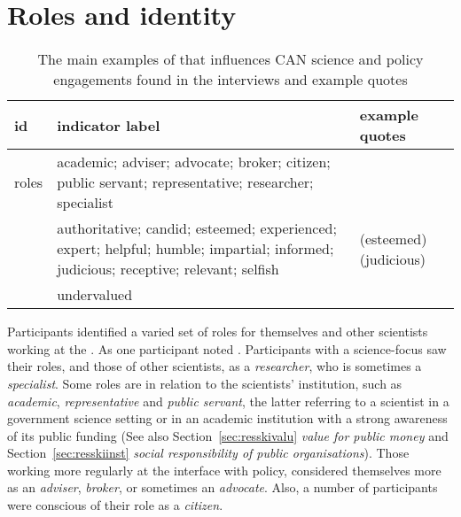 \section{Roles and identity}\label{sec:resroles}

\begin{table}[!ht]
\footnotesize
\caption{The main examples of \ismsr{} that influences CAN science and policy  engagements found in the interviews and example quotes}\label{tab:resrole}
\begin{tabular}{L{.15\linewidth}L{.35\linewidth}L{.5\linewidth}} \hline
\textbf{id} & \textbf{indicator label} & \textbf{example quotes} \\ \hline \hline
roles & academic; adviser; advocate; broker; citizen; public servant; representative; researcher; specialist &   \vfill {} \\[2mm]\rule{0pt}{4ex}
 & authoritative; candid; esteemed; experienced; expert; helpful; humble; impartial; informed; judicious; receptive; relevant; selfish &  (esteemed) \vfill {} (judicious) \\[2mm] \rule{0pt}{4ex}
& undervalued &  \\[5mm] \hline
\end{tabular}
\end{table}


Participants identified a varied set of roles for themselves and other scientists working at the \SPI. As one participant noted . Participants with a science-focus saw their roles, and those of other scientists, as a \emph{researcher}, who is sometimes a \emph{specialist}. Some roles are in relation to the scientists' institution, such as \emph{academic}, \emph{representative} and \emph{public servant}, the latter referring to a scientist in a government science setting or in an academic institution with a strong awareness of its public funding (See also Section~\ref{sec:resskivalu} \emph{value for public money} and Section~\ref{sec:resskiinst} \emph{social responsibility of public organisations}). Those working more regularly at the interface with policy, considered themselves more as an \emph{adviser}, \emph{broker}, or sometimes an \emph{advocate}. Also, a number of participants were conscious of their role as a \emph{citizen}.

